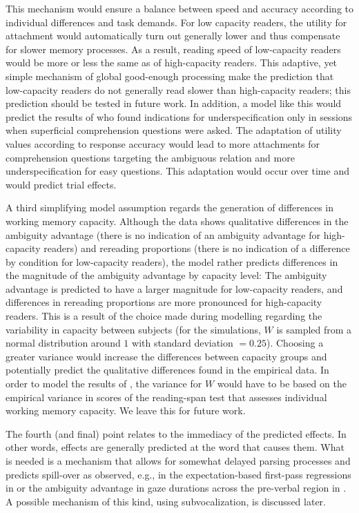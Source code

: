 \documentclass{cambridge7A}\usepackage[]{graphicx}\usepackage[]{color}
\begin{document}
This mechanism would ensure a balance between speed and accuracy according to individual differences and task demands.
For low capacity readers, the utility for attachment would automatically turn out generally lower and thus compensate for slower memory processes. As a result, reading speed of low-capacity readers would be more or less the same as of high-capacity readers. This adaptive, yet simple mechanism of global good-enough processing make the prediction that low-capacity readers do not generally read slower than high-capacity readers; this prediction should be tested in future work.
In addition, a model like this would predict the results of \cite{SwetsDesmetClifton2008} who found indications for underspecification only in sessions when superficial comprehension questions were asked. The adaptation of utility values according to response accuracy would lead to more attachments for comprehension questions targeting the ambiguous relation and more underspecification for easy questions. This adaptation would occur over time and would predict trial effects.

A third simplifying model assumption regards the generation of differences in working memory capacity. Although the data shows qualitative differences in the ambiguity advantage (there is no indication of an ambiguity advantage for high-capacity readers) and rereading proportions (there is no indication of a difference by condition for low-capacity readers), the model rather predicts differences in the magnitude of the ambiguity advantage by capacity level: The ambiguity advantage is predicted to have a larger magnitude for low-capacity readers, and differences in rereading proportions are more pronounced for high-capacity readers. This is a result of the choice made during modelling regarding the variability in capacity between subjects (for the simulations, $W$ is sampled from a normal distribution around $1$ with standard deviation $=0.25$). Choosing a greater variance would increase the differences between capacity groups and potentially predict the qualitative differences found in the empirical data. In order to model the results of \cite{MalsburgVasishth2013}, the variance for $W$ would have to be based on the empirical variance in scores of the reading-span test that assesses individual working memory capacity. We leave this for future work.

The fourth (and final) point relates to the  immediacy of the predicted effects. In other words, effects are generally predicted at the word that causes them. What is needed is a mechanism that allows for somewhat delayed parsing processes and predicts spill-over as observed, e.g., in the expectation-based first-pass regressions in \cite{Staub2010a} or the ambiguity advantage in gaze durations across the pre-verbal region in \cite{MalsburgVasishth2013}. A possible mechanism of this kind, using subvocalization, is discussed later.
\end{document}
